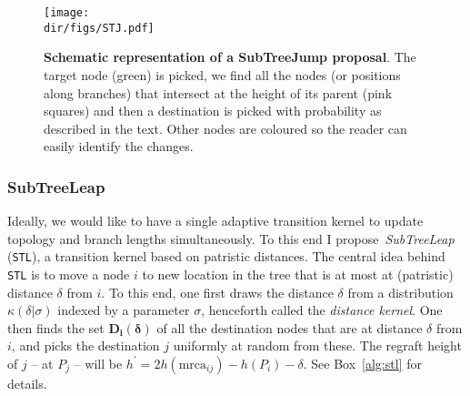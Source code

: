 \begin{figure}[!ht]
\texttt{[image: \\dir/figs/STJ.pdf]}
 \caption[Schematic representation of a SubTreeJump proposal]{\textbf{Schematic representation of a SubTreeJump proposal}. The target node (green) is picked, we find all the nodes (or positions along branches) that intersect at the height of its parent (pink squares) and then a destination is picked with probability as described in the text.
 Other nodes are coloured so the reader can easily identify the changes.}
 \label{fig:stj}
\end{figure}


\subsubsection*{SubTreeLeap} 

Ideally, we would like to have a single adaptive transition kernel to update topology and branch lengths simultaneously.
To this end I propose~\textit{SubTreeLeap} (\verb|STL|), a transition kernel based on patristic distances.
The central idea behind \verb|STL| is to move a node $i$ to new location in the tree that is at most at (patristic) distance $\delta$ from $i$.
To this end, one first draws the distance $\delta$ from a distribution $\kappa(\delta | \sigma)$ indexed by a parameter $\sigma$, henceforth called the \textit{distance kernel}.
One then finds the set $\mathbf{D_i(\delta)}$ of all the destination nodes that are at distance $\delta$ from $i$, and picks the destination $j$ uniformly at random from these.
The regraft height of $j$ -- at $P_j$ -- will be $h^\prime = 2 h(\text{mrca}_{ij}) - h(P_i) -\delta$.
See Box~\ref{alg:stl} for details.

